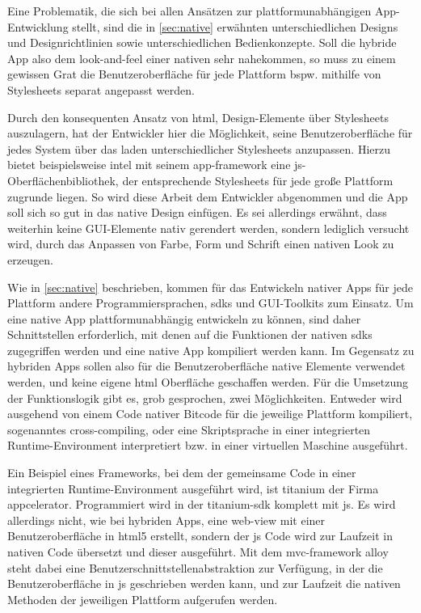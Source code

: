 Eine Problematik, die sich bei allen Ansätzen zur plattformunabhängigen App-Entwicklung stellt, sind die in \autoref{sec:native} erwähnten unterschiedlichen Designs und Designrichtlinien sowie unterschiedlichen Bedienkonzepte. Soll die hybride App also dem \gls{look-and-feel} einer nativen sehr nahekommen, so muss zu einem gewissen Grat die Benutzeroberfläche für jede Plattform bspw. mithilfe von Stylesheets separat angepasst werden.

Durch den konsequenten Ansatz von \gls{html}, Design-Elemente über Stylesheets auszulagern, hat der Entwickler hier die Möglichkeit, seine Benutzeroberfläche für jedes System über das laden unterschiedlicher Stylesheets anzupassen.
Hierzu bietet beispielsweise \gls{intel} mit seinem \gls{app-framework} eine \gls{js}-Oberflächenbibliothek, der entsprechende Stylesheets für jede große Plattform zugrunde liegen. So wird diese Arbeit dem Entwickler abgenommen und die App soll sich so gut in das native Design einfügen.
Es sei allerdings erwähnt, dass weiterhin keine GUI-Elemente nativ gerendert werden, sondern lediglich versucht wird, durch das Anpassen von Farbe, Form und Schrift einen nativen Look zu erzeugen.

Wie in \autoref{sec:native} beschrieben, kommen für das Entwickeln nativer Apps für jede Plattform andere Programmiersprachen, \glspl{sdk} und GUI-Toolkits zum Einsatz. Um eine native App plattformunabhängig entwickeln zu können, sind daher Schnittstellen erforderlich, mit denen auf die Funktionen der nativen \glspl{sdk} zugegriffen werden und eine native App kompiliert werden kann. Im Gegensatz zu hybriden Apps sollen also für die Benutzeroberfläche native Elemente verwendet werden, und keine eigene \gls{html} Oberfläche geschaffen werden. Für die Umsetzung der Funktionslogik gibt es, grob gesprochen, zwei Möglichkeiten. Entweder wird ausgehend von einem Code nativer Bitcode für die jeweilige Plattform kompiliert, sogenanntes \gls{cross-compiling}, oder eine Skriptsprache in einer integrierten Runtime-Environment interpretiert bzw. in einer virtuellen Maschine ausgeführt.

Ein Beispiel eines Frameworks, bei dem der gemeinsame Code in einer integrierten Runtime-Environment ausgeführt wird, ist \gls{titanium} der Firma \gls{appcelerator}. Programmiert wird in der  \gls{titanium}-\gls{sdk} komplett mit \gls{js}. Es wird allerdings nicht, wie bei hybriden Apps, eine \gls{web-view} mit einer Benutzeroberfläche in \gls{html5} erstellt, sondern der \gls{js} Code wird zur Laufzeit in nativen Code übersetzt und dieser ausgeführt. Mit dem \gls{mvc}-\gls{framework} \gls{alloy} steht dabei eine Benutzerschnittstellenabstraktion zur Verfügung, in der die Benutzeroberfläche in \gls{js} geschrieben werden kann, und zur Laufzeit die nativen Methoden der jeweiligen Plattform aufgerufen werden.

